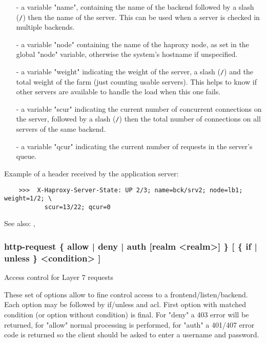   \begin{itemize}
  \item[-] a variable "name", containing the name of the backend followed by a slash
      (\verb|/|) then the name of the server. This can be used when a server is
      checked in multiple backends.

  \item[-] a variable "node" containing the name of the haproxy node, as set in the
      global "node" variable, otherwise the system's hostname if unspecified.

  \item[-] a variable "weight" indicating the weight of the server, a slash (\verb|/|)
      and the total weight of the farm (just counting usable servers). This
      helps to know if other servers are available to handle the load when this
      one fails.

  \item[-] a variable "scur" indicating the current number of concurrent connections
      on the server, followed by a slash (\verb|/|) then the total number of
      connections on all servers of the same backend.

  \item[-] a variable "qcur" indicating the current number of requests in the
      server's queue.
  \end{itemize}

  Example of a header received by the application server:
  \begin{verbatim}
    >>>  X-Haproxy-Server-State: UP 2/3; name=bck/srv2; node=lb1; weight=1/2; \
           scur=13/22; qcur=0
  \end{verbatim}

  See also: , 

\subsubsection[http-request]{http-request \{ allow | deny | auth [realm <realm>] \} [ \{ if | unless \} <condition> ]}
\index{http-request}
  Access control for Layer 7 requests


  These set of options allow to fine control access to a
  frontend/listen/backend. Each option may be followed by if/unless and acl.
  First option with matched condition (or option without condition) is final.
  For "deny" a 403 error will be returned, for "allow" normal processing is
  performed, for "auth" a 401/407 error code is returned so the client
  should be asked to enter a username and password.

